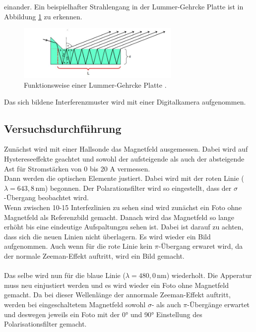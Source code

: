 einander.
Ein beispielhafter Strahlengang in der Lummer-Gehrcke Platte ist in Abbildung \ref{fig:Gehrcke} zu erkennen.
\begin{figure}[H]
  \centering
  \includegraphics[width=0.7\textwidth]{pics/Lena-Gehrcke.JPG}
  \caption{Funktionsweise einer Lummer-Gehrcke Platte \cite{Anleitung}.}
  \label{fig:Gehrcke}
\end{figure}
Das sich bildene Interferenzmuster wird mit einer Digitalkamera aufgenommen.
\subsection{Versuchsdurchführung}
Zunächst wird mit einer Hallsonde das Magnetfeld ausgemessen. Dabei wird auf Hystereseeffekte geachtet und
sowohl der aufsteigende als auch der absteigende Ast für Stromstärken von 0 bis 20 A vermessen.\\
Dann werden die optischen Elemente justiert. Dabei wird mit der roten Linie ($\lambda = 643,8\,$nm)
begonnen. Der Polarationsfilter wird so eingestellt, dass der $\sigma$-Übergang beobachtet wird.\\
Wenn zwischen 10-15 Interfezlinien zu sehen sind wird zunächst ein Foto ohne Magnetfeld als Referenzbild gemacht.
Danach wird das Magnetfeld so lange erhöht bis eine eindeutige Aufspaltungzu sehen ist. Dabei ist darauf zu achten,
dass sich die neuen Linien nicht überlagern. Es wird wieder ein Bild aufgenommen. Auch wenn für die rote Linie
kein $\pi$-Übergang erwaret wird, da der normale Zeeman-Effekt auftritt, wird ein Bild gemacht.\\
\\Das selbe wird nun für die blaue Linie ($\lambda = 480,0\,$nm) wiederholt. Die Apperatur muss neu einjustiert werden
und es wird wieder ein Foto ohne Magnetfeld gemacht. Da bei dieser Wellenlänge der annormale Zeeman-Effekt auftritt, werden
bei eingeschaltetem Magnetfeld sowohl $\sigma$- als auch $\pi$-Übergänge erwartet und deswegen jeweils ein Foto mit
der 0° und 90° Einstellung des Polarisationsfilter gemacht.
